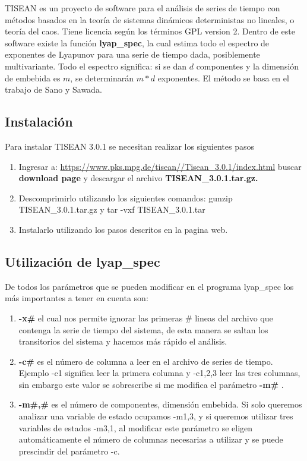 \documentclass[10pt,a4paper]{article}
\begin{document}
TISEAN es un proyecto de software para el análisis de series de tiempo con métodos basados en la teoría de sistemas dinámicos deterministas no lineales, o teoría del caos. Tiene licencia según los términos GPL version 2. Dentro de este software existe la función \textbf{lyap\_{}spec}, la cual estima todo el espectro de exponentes de Lyapunov para una serie de tiempo dada, posiblemente multivariante. Todo el espectro significa: si se dan $d$ componentes y la dimensión de embebida es $m$, se determinarán $m * d$ exponentes. El método se basa en el trabajo de Sano y Sawada.

\subsection{Instalación}
Para instalar TISEAN 3.0.1 se necesitan realizar los siguientes pasos 

\begin{enumerate}
\item Ingresar a: \url{https://www.pks.mpg.de/tisean//Tisean_3.0.1/index.html} buscar \textbf{download page} y descargar el archivo \textbf{TISEAN\_{}3.0.1.tar.gz.}

\item Descomprimirlo utilizando los siguientes comandos: gunzip TISEAN\_{}3.0.1.tar.gz y tar -vxf TISEAN\_{}3.0.1.tar

\item Instalarlo utilizando los pasos descritos en la pagina web.

\end{enumerate}

\subsection{Utilización de lyap\_{}spec}

De todos los parámetros que se pueden modificar en el programa lyap\_{}spec los más importantes a tener en cuenta son:

\begin{enumerate}
	\item \textbf{-x\#} el cual nos permite ignorar las primeras \# lineas del archivo que contenga la serie de tiempo del sistema, de esta manera se saltan los transitorios del sistema y hacemos más rápido el análisis. 
	\item \textbf{-c\#} es el número de columna a leer en el archivo de series de tiempo. Ejemplo -c1 significa leer la primera columna y -c1,2,3 leer las tres columnas, sin embargo este valor se sobrescribe si me modifica el parámetro \textbf{-m\#} .
	\item \textbf{-m\#,\#} es el número de componentes, dimensión embebida. Si solo queremos analizar una variable de estado ocupamos -m1,3, y si queremos utilizar tres variables de estados -m3,1, al modificar este parámetro se eligen automáticamente el número de columnas necesarias a utilizar y se puede prescindir del parámetro -c.
\end{enumerate}
\end{document}
